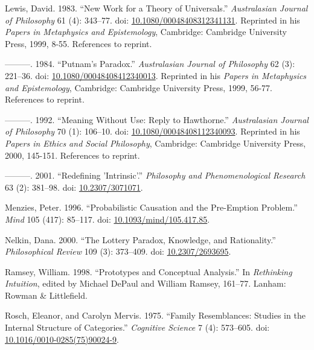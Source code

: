 \documentclass[
  10pt,
  letterpaper,
  DIV=11,
  numbers=noendperiod,
  twoside]{scrartcl}
\newlength{\cslhangindent}
\newenvironment{CSLReferences}[2] %
 {\begin{list}{}{%
  \setlength{\itemindent}{0pt}
  \setlength{\leftmargin}{0pt}
  \setlength{\parsep}{0pt}
  \ifodd #1
   \setlength{\leftmargin}{\cslhangindent}
   \setlength{\itemindent}{-1\cslhangindent}
  \fi
  \setlength{\itemsep}{#2\baselineskip}}}
 {\end{list}}
\begin{document}
\begin{CSLReferences}{1}{0}
Lewis, David. 1983. {``New Work for a Theory of Universals.''}
\emph{Australasian Journal of Philosophy} 61 (4): 343--77. doi:
\href{https://doi.org/10.1080/00048408312341131}{10.1080/00048408312341131}.
Reprinted in his \emph{Papers in Metaphysics and Epistemology},
Cambridge: Cambridge University Press, 1999, 8-55. References to
reprint.

---------. 1984. {``Putnam's Paradox.''} \emph{Australasian Journal of
Philosophy} 62 (3): 221--36. doi:
\href{https://doi.org/10.1080/00048408412340013}{10.1080/00048408412340013}.
Reprinted in his \emph{Papers in Metaphysics and Epistemology},
Cambridge: Cambridge University Press, 1999, 56-77. References to
reprint.

---------. 1992. {``Meaning Without Use: Reply to {H}awthorne.''}
\emph{Australasian Journal of Philosophy} 70 (1): 106--10. doi:
\href{https://doi.org/10.1080/00048408112340093}{10.1080/00048408112340093}.
Reprinted in his \emph{Papers in Ethics and Social Philosophy},
Cambridge: Cambridge University Press, 2000, 145-151. References to
reprint.

---------. 2001. {``Redefining 'Intrinsic'.''} \emph{Philosophy and
Phenomenological Research} 63 (2): 381--98. doi:
\href{https://doi.org/10.2307/3071071}{10.2307/3071071}.

Menzies, Peter. 1996. {``Probabilistic Causation and the Pre-Emption
Problem.''} \emph{Mind} 105 (417): 85--117. doi:
\href{https://doi.org/10.1093/mind/105.417.85}{10.1093/mind/105.417.85}.

Nelkin, Dana. 2000. {``The Lottery Paradox, Knowledge, and
Rationality.''} \emph{Philosophical Review} 109 (3): 373--409. doi:
\href{https://doi.org/10.2307/2693695}{10.2307/2693695}.

Ramsey, William. 1998. {``Prototypes and Conceptual Analysis.''} In
\emph{Rethinking Intuition}, edited by Michael DePaul and William
Ramsey, 161--77. Lanham: Rowman \& Littlefield.

Rosch, Eleanor, and Carolyn Mervis. 1975. {``Family Resemblances:
Studies in the Internal Structure of Categories.''} \emph{Cognitive
Science} 7 (4): 573--605. doi:
\href{https://doi.org/10.1016/0010-0285(75)90024-9}{10.1016/0010-0285(75)90024-9}.


\end{CSLReferences}
\end{document}
